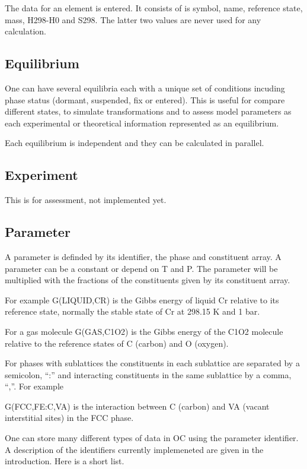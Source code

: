 \documentclass[12pt]{article}
\begin{document}
The data for an element is entered.  It consists of is symbol, name,
reference state, mass, H298-H0 and S298.  The latter two values are 
never used for any calculation.

\subsection{Equilibrium}

One can have several equilibria each with a unique set of conditions
incuding phase status (dormant, suspended, fix or entered).  This is
useful for compare different states, to simulate transformations and
to assess model parameters as each experimental or theoretical
information represented as an equilibrium.  

Each equilibrium is independent and they can be calculated in
parallel.

\subsection{Experiment}

This is for assessment, not implemented yet.

\subsection{Parameter}

A parameter is definded by its identifier, the phase and constituent
array.  A parameter can be a constant or depend on T and P.  The
parameter will be multiplied with the fractions of the constituents
given by its constituent array.

For example G(LIQUID,CR) is the Gibbs energy of liquid Cr relative to
its reference state, normally the stable state of Cr at 298.15 K and 1
bar.

For a gas molecule G(GAS,C1O2) is the Gibbs energy of the C1O2 molecule
relative to the reference states of C (carbon) and O (oxygen).

For phases with sublattices the constituents in each sublattice are
separated by a semicolon, ``:'' and interacting constituents in
the same sublattice by a comma, ``,''.  For example

G(FCC,FE:C,VA) is the interaction between C (carbon) and VA (vacant
interstitial sites) in the FCC phase.

One can store many different types of data in OC using the parameter
identifier.  A description of the identifiers currently implemeneted
are given in the introduction.  Here is a short list.
\end{document}
